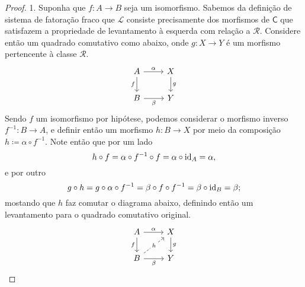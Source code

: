 \begin{proof}
  1. Suponha que $f: A \to B$ seja um isomorfismo.
  Sabemos da definição de sistema de fatoração fraco que $\mathcal{L}$ consiste precisamente dos morfismos de $\mathsf{C}$ que satisfazem a propriedade de levantamento à esquerda com relação a $\mathcal{R}$.
  Considere então um quadrado comutativo como abaixo, onde $g: X \to Y$ é um morfismo pertencente à classe $\mathcal{R}$.
  \begin{displaymath}
    \begin{tikzcd}
      A
      \arrow[r, "\alpha"]
      \arrow[d, "f" swap]
      & X
      \arrow[d, "g"]
      \\ B
      \arrow[r, "\beta" swap]
      & Y
    \end{tikzcd}
  \end{displaymath}
  Sendo $f$ um isomorfismo por hipótese, podemos considerar o morfismo inverso $f^{-1}: B \to A$, e definir então um morfismo $h: B \to X$ por meio da composição $h \coloneqq \alpha \circ f^{-1}$.
  Note então que por um lado
  \begin{displaymath}
    h \circ f
    = \alpha \circ f^{-1} \circ f
    = \alpha \circ \mathrm{id}_{A}
    = \alpha,
  \end{displaymath}
  e por outro
  \begin{displaymath}
    g \circ h
    = g \circ \alpha \circ f^{-1}
    = \beta \circ f \circ f^{-1}
    = \beta \circ \mathrm{id}_{B}
    = \beta;
  \end{displaymath}
  mostando que $h$ faz comutar o diagrama abaixo, definindo então um levantamento para o quadrado comutativo original.
  \begin{displaymath}
    \begin{tikzcd}
      A
      \arrow[r, "\alpha"]
      \arrow[d, "f" swap]
      & X
      \arrow[d, "g"]
      \\ B
      \arrow[r, "\beta" swap]
      \arrow[ru, dashed, "h" description]
      & Y
    \end{tikzcd}
  \end{displaymath}


\end{proof}
